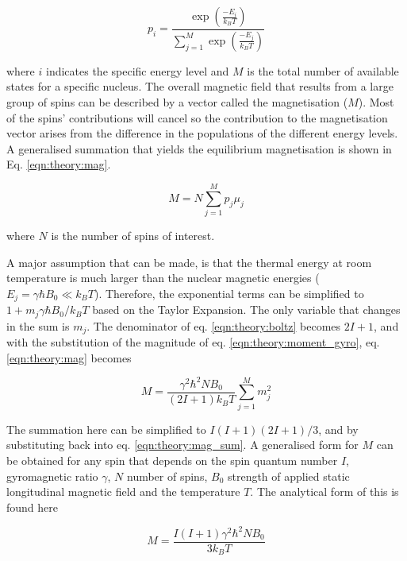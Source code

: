 \begin{equation}
    p_i = \frac{\exp\left(\frac{-E_i}{k_BT}\right)}{\displaystyle \sum_{j = 1}^{M}\exp\left(\frac{-E_j}{k_BT}\right)}
    \label{eqn:theory:boltz}
\end{equation}

\noindent where $i$ indicates the specific energy level and $M$ is the total number of available states for a specific nucleus. The overall magnetic field that results from a large group of spins can be described by a vector called the magnetisation ($M$). Most of the spins' contributions will cancel so the contribution to the magnetisation vector arises from the difference in the populations of the different energy levels. A generalised summation that yields the equilibrium magnetisation is shown in Eq. \ref{eqn:theory:mag}.

\begin{equation}
    M = N\sum_{j = 1}^{M}p_j\mu_j
    \label{eqn:theory:mag}
\end{equation}

\noindent where $N$ is the number of spins of interest. 

A major assumption that can be made, is that the thermal energy at room temperature is much larger than the nuclear magnetic energies ($E_j = \gamma \hbar B_0\ll k_BT$). Therefore, the exponential terms can be simplified to $1 +m_j\gamma \hbar B_0/k_BT$ based on the Taylor Expansion. The only variable that changes in the sum is $m_j$. The denominator of eq. \ref{eqn:theory:boltz} becomes $2I+1$, and with the substitution of the magnitude of eq. \ref{eqn:theory:moment_gyro}, eq. \ref{eqn:theory:mag} becomes

\begin{equation}
    M = \frac{\gamma^2\hbar^2NB_0}{(2I+1)k_BT}\sum_{j=1}^{M}m_j^2
    \label{eqn:theory:mag_sum}
\end{equation}

\noindent The summation here can be simplified to $I(I+1)(2I+1)/3$, and by substituting back into eq. \ref{eqn:theory:mag_sum}. A generalised form for $M$ can be obtained for any spin that depends on the spin quantum number $I$, gyromagnetic ratio $\gamma$, $N$ number of spins, $B_0$ strength of applied static longitudinal magnetic field and the temperature $T$. The analytical form of this is found here

\begin{equation}
    M = \frac{I(I+1)\gamma^2 \hbar^2 N B_0}{3k_BT}
    \label{eqn:theory:mag_s}
\end{equation}

